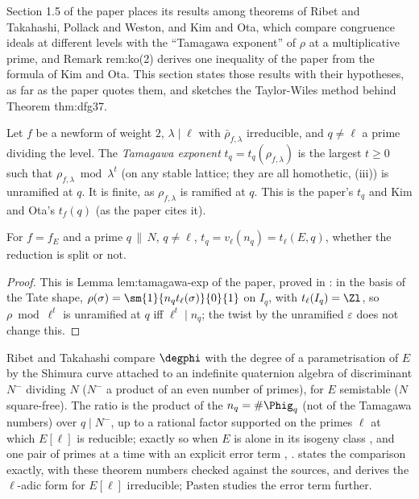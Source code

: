 Section 1.5 of the paper places its results among theorems of Ribet and Takahashi, Pollack and Weston, and Kim and Ota, which compare
congruence ideals at different levels with the ``Tamagawa exponent'' of $\rho$ at a multiplicative prime, and Remark rem:ko(2) derives one inequality of
the paper from the formula of Kim and Ota. This section states those results with their hypotheses, as far as the paper quotes them, and
sketches the Taylor-Wiles method behind Theorem thm:dfg37.

\begin{definition}\label{def:modgalrep:tamagawa-exponent}
Let $f$ be a newform of weight $2$, $\lambda\mid\ell$ with $\bar\rho_{f,\lambda}$ irreducible, and $q\ne\ell$ a prime dividing the level. The \emph{Tamagawa exponent} $t_q=t_q(\rho_{f,\lambda})$ is the
largest $t\ge0$ such that $\rho_{f,\lambda}\bmod\lambda^t$ (on any stable lattice; they are all homothetic, (iii)) is unramified at $q$. It is finite, as $\rho_{f,\lambda}$ is
ramified at $q$. This is the paper's $t_q$ and Kim and Ota's $t_f(q)$ \cite[Definition 1.15]{KimOta} (as the paper cites it).
\end{definition}

\begin{proposition}\label{prop:modgalrep:tamagawa-exponent}
For $f=f_E$ and a prime $q\,\|\,N$, $q\ne\ell$, $t_q=v_\ell(n_q)=t_\ell(E,q)$, whether the reduction is split or not.
\end{proposition}

\begin{proof}
This is Lemma lem:tamagawa-exp of the paper, proved in : in the basis of the Tate shape, $\rho(\sigma)=\sm{1}{n_qt_\ell(\sigma)}{0}{1}$ on $I_q$, with $t_\ell(I_q)=\Zl$, so
$\rho\bmod\ell^t$ is unramified at $q$ iff $\ell^t\mid n_q$; the twist by the unramified $\varepsilon$ does not change this.
\end{proof}

\begin{remark}\label{rem:modgalrep:ribet-takahashi}
Ribet and Takahashi \cite{RibetTakahashi97,Takahashi01} compare $\degphi$ with the degree of a parametrisation of $E$ by the Shimura curve attached to an indefinite
quaternion algebra of discriminant $N^-$ dividing $N$ ($N^-$ a product of an even number of primes), for $E$ semistable ($N$ square-free). The ratio is the product of the $n_q=\#\Phig_q$ (not
of the Tamagawa numbers) over $q\mid N^-$, up to a rational factor supported on the primes $\ell$ at which $E[\ell]$ is reducible; exactly so when $E$ is alone in its isogeny class
\cite[Corollary 3.5]{Takahashi01}, and one pair of primes at a time with an explicit error term \cite[Theorems 1 and 2]{RibetTakahashi97}, \cite[Theorem 3.2]{Takahashi01}.  states
the comparison exactly, with these theorem numbers checked against the sources, and derives the $\ell$-adic form for $E[\ell]$ irreducible; Pasten \cite{Pasten} studies the error term further.
\end{remark}

